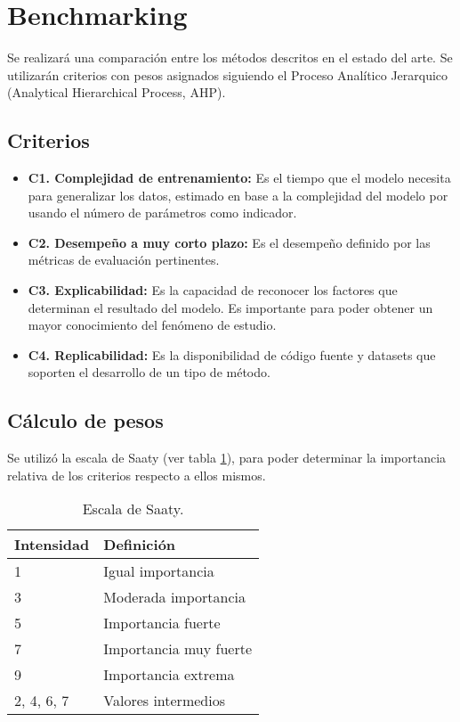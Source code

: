 \section{Benchmarking}

Se realizará una comparación entre los métodos descritos en el estado del arte. 
Se utilizarán criterios con pesos asignados siguiendo el Proceso Analítico 
Jerarquico (Analytical Hierarchical Process, AHP).
		
\subsection{Criterios}

\begin{itemize}
  \item \textbf{C1. Complejidad de entrenamiento:} Es el tiempo que 
  el modelo necesita para generalizar los datos, estimado en base a la 
  complejidad del modelo por usando el número de parámetros como indicador.
  \item \textbf{C2. Desempeño a muy corto plazo:} Es el desempeño definido por 
  las métricas de evaluación pertinentes.
  \item \textbf{C3. Explicabilidad:} Es la capacidad de reconocer los factores 
  que determinan el resultado del modelo. Es importante para poder obtener un 
  mayor conocimiento del fenómeno de estudio.
  \item \textbf{C4. Replicabilidad:} Es la disponibilidad de código fuente 
  y datasets que soporten el desarrollo de un tipo de método.
\end{itemize}

\subsection{Cálculo de pesos}
Se utilizó la escala de Saaty (ver tabla \ref{tab:escala_saaty}), para poder 
determinar la importancia relativa de los criterios respecto a ellos mismos.

\begin{table}[H]
  \centering
  \caption[Escala de Saaty]{Escala de Saaty.}
  \begin{tabular}{l|l}
  \textbf{Intensidad} & \textbf{Definición}    \\ \hline
  1                   & Igual importancia      \\
  3                   & Moderada importancia   \\
  5                   & Importancia fuerte     \\
  7                   & Importancia muy fuerte \\
  9                   & Importancia extrema    \\
  2, 4, 6, 7          & Valores intermedios   
  \end{tabular}
  \label{tab:escala_saaty}
\end{table}


